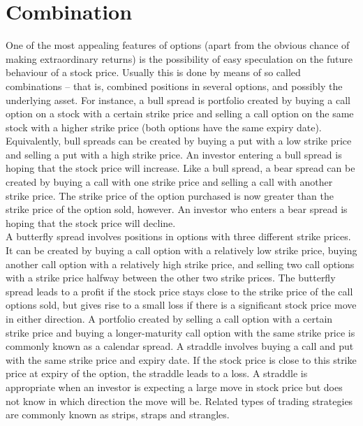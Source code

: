 \documentclass{book}
\begin{document}
\section{Combination}
One of the most appealing features of options (apart from the obvious chance of making extraordinary
returns) is the possibility of easy speculation on the future behaviour of a stock price. Usually
this is done by means of so called combinations – that is, combined positions in several options, and
possibly the underlying asset. For instance, a bull spread is portfolio created by buying a call option on a stock with a certain strike price and selling a call option on the same stock with a higher strike price (both options have the same expiry date). Equivalently, bull spreads can be created by buying a put with a low strike price and selling a put with a high strike price. An investor entering a bull spread is hoping that the stock price will increase. Like a bull spread, a bear spread can be created by buying a call with one strike price and selling a call with another strike price. The strike price of the option purchased is now greater than the strike price of the option sold, however. An investor who enters a bear spread is hoping that the stock price will decline.\\
A butterfly spread involves positions in options with three different strike prices. It can be created by buying a call option with a relatively low strike price, buying another call option with a relatively high strike price, and selling two call options with a strike price halfway between the other two strike prices. The butterfly spread leads to a profit if the stock price stays close to the strike price of the call options sold, but gives rise to a small loss if there is a significant stock price move in either direction. A portfolio created by selling a call option with a certain strike price and buying a longer-maturity call option with the same strike price is commonly known as a calendar spread. A straddle involves buying a call and put with the same strike price and expiry date. If the stock price is close to this strike price at expiry of the option, the straddle leads to a loss. A straddle is appropriate when an investor is expecting a large move in stock price but does not know in which direction the move will be. Related types of trading strategies are commonly known as strips, straps and strangles.
\end{document}
